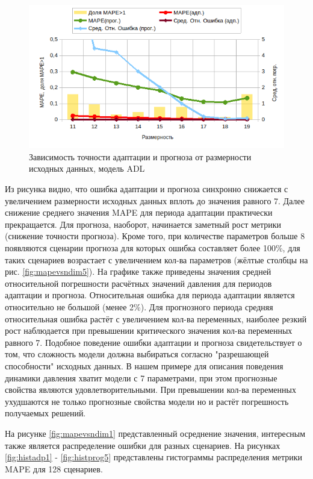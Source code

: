 \documentclass[14pt]{article}
\begin{document}
\begin{figure}
	\centering
	\includegraphics[width=0.9\linewidth]{mape_vs_ndim_adl}
	\caption{Зависимость точности адаптации и прогноза от размерности исходных данных, модель ADL}
	\label{fig:mapevsndimadl}
\end{figure}

Из рисунка видно, что ошибка адаптации и прогноза синхронно снижается с увеличением размерности исходных данных вплоть до значения равного 7. Далее снижение среднего значения MAPE для периода адаптации практически прекращается. Для прогноза, наоборот, начинается заметный рост метрики (снижение точности прогноза). Кроме того, при количестве параметров больше 8 появляются сценарии прогноза для которых ошибка составляет более 100\%, для таких сценариев возрастает с увеличением кол-ва параметров (жёлтые столбцы на рис. \ref{fig:mapevsndim5}). На графике также приведены значения средней относительной погрешности расчётных значений давления для периодов адаптации и прогноза. Относительная ошибка для периода адаптации является относительно не большой (менее 2\%). Для прогнозного периода средняя относительная ошибка растёт с увеличением кол-ва переменных, наиболее резкий рост наблюдается при превышении критического значения кол-ва переменных равного 7.  Подобное поведение ошибки адаптации и прогноза свидетельствует о том, что сложность модели должна выбираться согласно "разрешающей способности" исходных данных. В нашем примере для описания поведения динамики давления хватит модели с 7 параметрами, при этом прогнозные свойства являются удовлетворительными. При превышении кол-ва переменных ухудшаются не только прогнозные свойства модели но и растёт погрешность получаемых решений. 

На рисунке \ref{fig:mapevsndim1} представленный осреднение значения, интересным также является распределение ошибки для разных сценариев. На рисунках \ref{fig:histadp1} - \ref{fig:histprog5} представлены гистограммы распределения метрики MAPE для 128 сценариев. 
\end{document}
